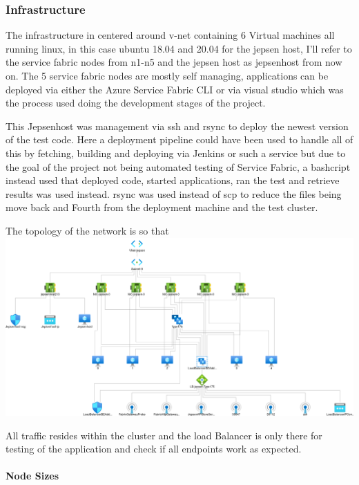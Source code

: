 \documentclass[a4paper,10pt,titlepage]{report}
\begin{document}
\subsubsection{Infrastructure}
The infrastructure in centered around v-net containing 6 Virtual machines all running linux, in this case ubuntu 18.04 and 20.04 for the jepsen host, I'll refer to the service fabric nodes from n1-n5 and the jepsen host as jepsenhost from now on.
The 5 service fabric nodes are mostly self managing, applications can be deployed via either the Azure Service Fabric CLI\cite{https://docs.microsoft.com/en-us/azure/service-fabric/service-fabric-cli} or via visual studio\cite{https://docs.microsoft.com/en-us/azure/service-fabric/service-fabric-tutorial-deploy-app-to-party-cluster} which was the process used doing the development stages of the project.

This Jepsenhost was management via ssh and rsync to deploy the newest version of the test code. Here a deployment pipeline could have been used to handle all of this by fetching, building and deploying via Jenkins or such a service but due to the goal of the project not being automated testing of Service Fabric, a bashcript instead used that deployed code, started applications, ran the test and retrieve results was used instead. rsync was used instead of scp to reduce the files being move back and Fourth from the deployment machine and the test cluster. 

The topology of the network is so that
\includegraphics{images/topology.png}

All traffic resides within the cluster and the load Balancer is only there for testing of the application and check if all endpoints work as expected.

\paragraph*{Node Sizes}
\end{document}
